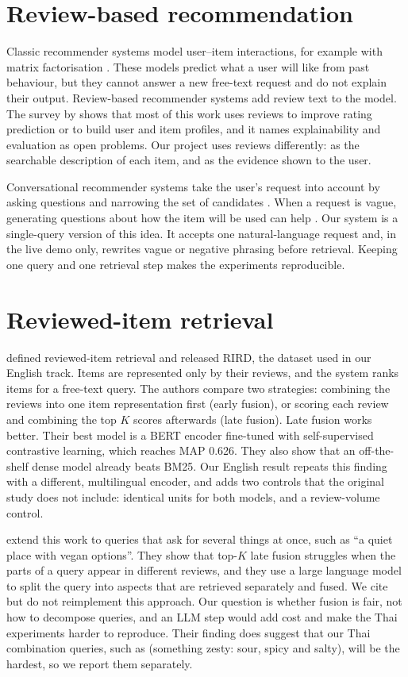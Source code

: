 \section{Review-based recommendation}
Classic recommender systems model user--item interactions, for example with matrix
factorisation \citep{koren2009matrix}. These models predict what a user will like from past
behaviour, but they cannot answer a new free-text request and do not explain their output.
Review-based recommender systems add review text to the model. The survey by
\citet{hasan2025reviewsurvey} shows that most of this work uses reviews to improve rating
prediction or to build user and item profiles, and it names explainability and evaluation as
open problems. Our project uses reviews differently: as the searchable description of each item,
and as the evidence shown to the user.

Conversational recommender systems take the user's request into account by asking questions
and narrowing the set of candidates \citep{gao2021conversational}. When a request is vague,
generating questions about how the item will be used can help \citep{kostric2024usage}. Our
system is a single-query version of this idea. It accepts one natural-language request and, in
the live demo only, rewrites vague or negative phrasing before retrieval. Keeping one query and
one retrieval step makes the experiments reproducible.

\section{Reviewed-item retrieval}
\citet{rird2023} defined reviewed-item retrieval and released RIRD, the dataset used in our
English track. Items are represented only by their reviews, and the system ranks items for a
free-text query. The authors compare two strategies: combining the reviews into one item
representation first (early fusion), or scoring each review and combining the top $K$ scores
afterwards (late fusion). Late fusion works better. Their best model is a BERT encoder
fine-tuned with self-supervised contrastive learning, which reaches MAP 0.626. They also show
that an off-the-shelf dense model already beats BM25. Our English result repeats this finding
with a different, multilingual encoder, and adds two controls that the original study does not
include: identical units for both models, and a review-volume control.

\citet{korikov2024multiaspect} extend this work to queries that ask for several things at once,
such as ``a quiet place with vegan options''. They show that top-$K$ late fusion struggles when
the parts of a query appear in different reviews, and they use a large language model to split
the query into aspects that are retrieved separately and fused. We cite but do not reimplement
this approach. Our question is whether fusion is fair, not how to decompose queries, and an LLM
step would add cost and make the Thai experiments harder to reproduce. Their finding does
suggest that our Thai combination queries, such as 
(something zesty: sour, spicy and salty), will be the hardest, so we report them separately.

